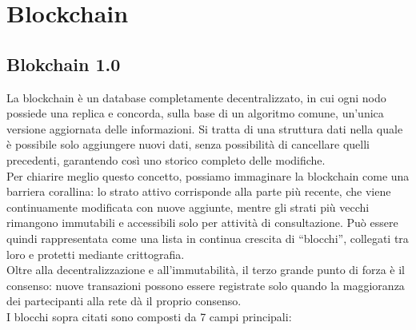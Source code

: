 \chapter{Blockchain}
\section{Blokchain 1.0}
La blockchain è un database completamente decentralizzato, in cui ogni nodo possiede una replica e concorda, sulla base di un algoritmo comune, un’unica versione aggiornata delle informazioni. Si tratta di una struttura dati nella quale è possibile solo aggiungere nuovi dati, senza possibilità di cancellare quelli precedenti, garantendo così uno storico completo delle modifiche.
\\Per chiarire meglio questo concetto, possiamo immaginare la blockchain come una barriera corallina: lo strato attivo corrisponde alla parte più recente, che viene continuamente modificata con nuove aggiunte, mentre gli strati più vecchi rimangono immutabili e accessibili solo per attività di consultazione.
Può essere quindi rappresentata come una lista in continua crescita di “blocchi”, collegati tra loro e protetti mediante crittografia. 
\\Oltre alla decentralizzazione e all’immutabilità, il terzo grande punto di forza è il consenso: nuove transazioni possono essere registrate solo quando la maggioranza dei partecipanti alla rete dà il proprio consenso.
\\I blocchi sopra citati sono composti da 7 campi principali: 
\vspace{1em}
